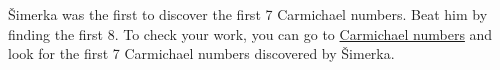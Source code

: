   \v{S}imerka was the first to discover the first 7 Carmichael numbers.
  Beat him by finding the first 8.
  To check your work, you can go to 
  \href{https://en.wikipedia.org/wiki/Carmichael_number}{Carmichael numbers}
  and look for the first 7 Carmichael numbers discovered by \v{S}imerka.
